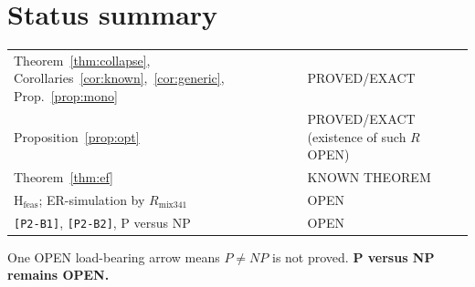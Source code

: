 \documentclass[11pt]{article}
\theoremstyle{definition}
\theoremstyle{remark}
\begin{document}
\section*{Status summary}
\begin{tabular}{ll}
Theorem~\ref{thm:collapse}, Corollaries~\ref{cor:known},~\ref{cor:generic}, Prop.~\ref{prop:mono} & PROVED/EXACT\\
Proposition~\ref{prop:opt} & PROVED/EXACT (existence of such $R$ OPEN)\\
Theorem~\ref{thm:ef} & KNOWN THEOREM\\
$\mathrm{H}_{\mathrm{feas}}$; ER-simulation by $R_{\mathrm{mix341}}$ & OPEN\\
\texttt{[P2-B1]}, \texttt{[P2-B2]}, P versus NP & OPEN
\end{tabular}

\medskip\noindent One OPEN load-bearing arrow means $P\ne NP$ is not proved.
\textbf{P versus NP remains OPEN.}
\end{document}
